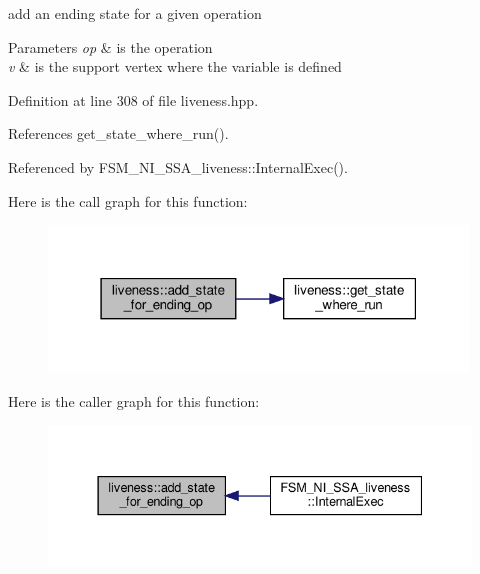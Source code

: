 add an ending state for a given operation 


\begin{DoxyParams}{Parameters}
{\em op} & is the operation \\
\hline
{\em v} & is the support vertex where the variable is defined \\
\hline
\end{DoxyParams}


Definition at line 308 of file liveness.\+hpp.



References get\+\_\+state\+\_\+where\+\_\+run().



Referenced by F\+S\+M\+\_\+\+N\+I\+\_\+\+S\+S\+A\+\_\+liveness\+::\+Internal\+Exec().

Here is the call graph for this function\+:
\nopagebreak
\begin{figure}[H]
\begin{center}
\leavevmode
\includegraphics[width=316pt]{d3/d1f/classliveness_a288fca9d3983f844e29898fcf401890a_cgraph}
\end{center}
\end{figure}
Here is the caller graph for this function\+:
\nopagebreak
\begin{figure}[H]
\begin{center}
\leavevmode
\includegraphics[width=337pt]{d3/d1f/classliveness_a288fca9d3983f844e29898fcf401890a_icgraph}
\end{center}
\end{figure}
\mbox{\label{classliveness_a9c715edd104bd38483f3baeb47cdebce}} 
